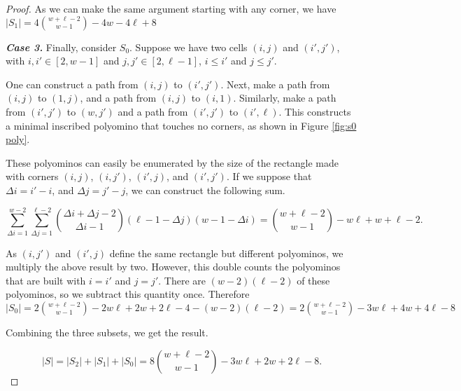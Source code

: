 \documentclass[12pt]{article}
\theoremstyle{plain}
\theoremstyle{definition}
\theoremstyle{remark}
\theoremstyle{definition}
\newcommand{\cell}[4]{\filldraw[gray!40] ( #1 , #2 ) rectangle ( #3 , #4 ); \draw[thick] ( #1 , #2 ) rectangle ( #3 , #4 );}
\newcommand{\cellred}[4]{\filldraw[red!60] ( #1 , #2 ) rectangle ( #3 , #4 ); \draw[thick] ( #1 , #2 ) rectangle ( #3 , #4 );}
\begin{document}
\begin{proof}
As we can make the same argument starting with any corner, we have $|S_1| = 4\binom{w+\ell-2}{w-1}-4w-4\ell+8$

\textbf{\textit{Case 3.}} Finally, consider $S_0$. Suppose we have two cells $(i,j)$ and $(i',j')$, with $i,i' \in [2,w-1]$ and $j,j' \in [2,\ell-1]$, $i \leq i'$ and $j \leq j'$. 

\begin{center}
    \label{fig:s0 poly}
\end{center}

One can construct a path from $(i,j)$ to $(i',j')$. Next, make a path from $(i,j)$ to $(1,j)$, and a path from $(i,j)$ to $(i,1)$. Similarly, make a path from $(i',j')$ to $(w,j')$ and a path from $(i',j')$ to $(i',\ell)$. This constructs a minimal inscribed polyomino that touches no corners, as shown in Figure \ref{fig:s0 poly}. 

These polyominos can easily be enumerated by the size of the rectangle made with corners $(i,j)$, $(i,j')$, $(i',j)$, and $(i',j')$. If we suppose that $\Delta i = i'-i$, and $\Delta j = j'-j$, we can construct the following sum.

$$\sum_{\Delta i=1}^{w-2}\sum_{\Delta j=1}^{\ell-2}\binom{\Delta i+\Delta j-2}{\Delta i-1}(\ell-1- \Delta j)(w-1- \Delta i)= \binom{w+\ell-2}{w-1} -w\ell + w+\ell-2.$$

As $(i,j')$ and $(i',j)$ define the same rectangle but different polyominos, we multiply the above result by two. However, this double counts the polyominos that are built with $i=i'$ and $j=j'$. There are $(w-2)(\ell-2)$ of these polyominos, so we subtract this quantity once. Therefore $|S_0| = 2\binom{w+\ell-2}{w-1} -2w\ell + 2w+2\ell-4 - (w-2)(\ell-2) = 2\binom{w+\ell-2}{w-1} -3w\ell +4w +4\ell -8$

Combining the three subsets, we get the result.

$$|S| = |S_2|+|S_1|+|S_0|=8\binom{w+\ell-2}{w-1} -3w\ell + 2w +2\ell-8.$$

\end{proof}
\end{document}
